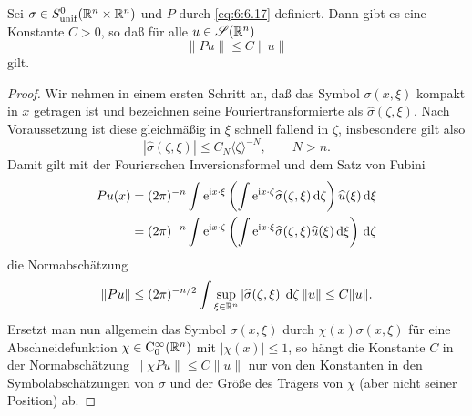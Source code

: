 \begin{thm}
Sei $\sigma\in S^0_{\rm unif}(\mathbb R^n\times\mathbb R^n)$ und $P$ durch \eqref{eq:6:6.17} definiert. Dann gibt es eine Konstante $C>0$, so daß für alle $u\in\mathscr S(\mathbb R^n)$
\begin{equation}
   \| Pu\| \le C \|u\|
\end{equation}
gilt.
\end{thm}
\begin{proof}
Wir nehmen in einem ersten Schritt an, daß das Symbol $\sigma(x,\xi)$ kompakt in $x$ getragen ist und bezeichnen seine Fouriertransformierte 
als $\widehat \sigma(\zeta,\xi)$. Nach Voraussetzung ist diese gleichmäßig in $\xi$ schnell fallend in $\zeta$, insbesondere gilt also
\begin{equation}
   |\widehat \sigma(\zeta,\xi)| \le C_N \langle\zeta\rangle^{-N}, \qquad N>n. 
\end{equation}
Damit gilt mit der Fourierschen Inversionsformel und dem Satz von Fubini
\begin{align}
    P u(x) &= (2\pi)^{-n} \int \mathrm e^{\mathrm i x\cdot\xi} \left(\int \mathrm e^{\mathrm i x\cdot\zeta} \widehat \sigma(\zeta,\xi) \,\mathrm d\zeta\right) \widehat u(\xi)\,\mathrm d\xi \notag\\
    &= (2\pi)^{-n} \int \mathrm e^{\mathrm i x\cdot\zeta} \left( \int \mathrm e^{\mathrm i x\cdot\xi}\widehat \sigma(\zeta,\xi) \widehat u(\xi) \,\mathrm d\xi \right) \,\mathrm d\zeta
\end{align}
die Normabschätzung
\begin{equation}
  \| Pu \| \le (2\pi)^{-n/2} \int  \sup_{\xi\in\mathbb R^n} |\widehat \sigma(\zeta,\xi)| \,\mathrm d\zeta\, \|u\| \le C \|u\|. 
\end{equation}
Ersetzt man nun allgemein das Symbol $\sigma(x,\xi)$ durch $\chi(x)\sigma(x,\xi)$ für eine Abschneidefunktion $\chi\in\mathrm C_0^\infty(\mathbb R^n)$ 
mit $|\chi(x)|\le 1$, so hängt die Konstante $C$ in der Normabschätzung $\|\chi Pu\|\le C\|u\|$ nur von den Konstanten in den Symbolabschätzungen von $\sigma$ und der Größe des Trägers von $\chi$ (aber nicht seiner Position) ab.


\end{proof}
